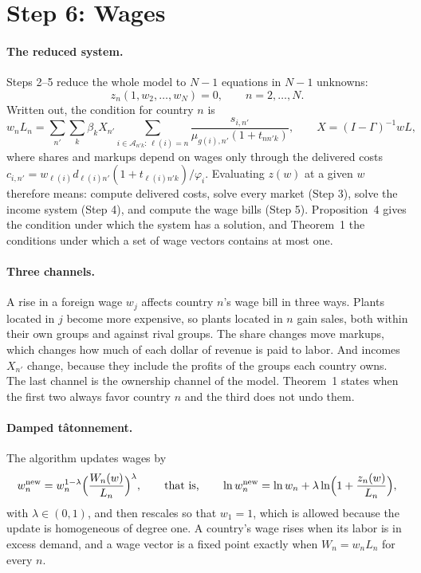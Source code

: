 \documentclass[11pt]{article}
\newcommand{\cA}{\mathcal A}
\begin{document}
\section{Step 6: Wages}
\label{sec:wages}

\paragraph{The reduced system.} Steps 2--5 reduce the whole model to $N-1$ equations in
$N-1$ unknowns:
\begin{equation}
  z_n(1,w_2,\dots,w_N)=0,\qquad n=2,\dots,N .
  \label{eq:reduced}
\end{equation}
Written out, the condition for country $n$ is
\[
  w_nL_n=\sum_{n'}\sum_k\beta_kX_{n'}
  \sum_{i\in\cA_{n'k}:\,\ell(i)=n}\frac{s_{i,n'}}{\mu_{g(i),n'}(1+t_{nn'k})},
  \qquad
  X=(I-\Gamma)^{-1}wL,
\]
where shares and markups depend on wages only through the delivered costs
$c_{i,n'}=w_{\ell(i)}d_{\ell(i)n'}(1+t_{\ell(i)n'k})/\varphi_i$. Evaluating $z(w)$ at a
given $w$ therefore means: compute delivered costs, solve every market (Step 3), solve
the income system (Step 4), and compute the wage bills (Step 5). Proposition~4 gives the
condition under which the system has a solution, and Theorem~1 the conditions under
which a set of wage vectors contains at most one.

\paragraph{Three channels.} A rise in a foreign wage $w_j$ affects country $n$'s wage
bill in three ways. Plants located in $j$ become more expensive, so plants located in
$n$ gain sales, both within their own groups and against rival groups. The share
changes move markups, which changes how much of each dollar of revenue is paid to labor.
And incomes $X_{n'}$ change, because they include the profits of the groups each
country owns. The last channel is the ownership channel of the model. Theorem~1 states
when the first two always favor country $n$ and the third does not undo them.

\paragraph{Damped tâtonnement.} The algorithm updates wages by
\begin{equation}
  w_n^{\text{new}}=w_n^{1-\lambda}\Bigl(\frac{W_n(w)}{L_n}\Bigr)^{\lambda},
  \qquad\text{that is,}\qquad
  \ln w_n^{\text{new}}=\ln w_n+\lambda\ln\Bigl(1+\frac{z_n(w)}{L_n}\Bigr),
  \label{eq:tatonnement}
\end{equation}
with $\lambda\in(0,1)$, and then rescales so that $w_1=1$, which is allowed because the
update is homogeneous of degree one. A country's wage rises when its labor is in excess
demand, and a wage vector is a fixed point exactly when $W_n=w_nL_n$ for every $n$.
\end{document}
